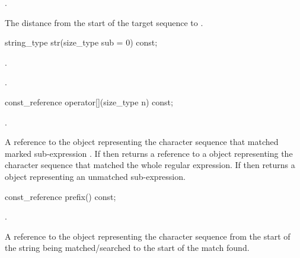 \begin{itemdescr}
\pnum
\requires {}.

\pnum
\returns  The distance from the start of the target sequence
to .
\end{itemdescr} 

%
%
\begin{itemdecl}
string_type str(size_type sub = 0) const;
\end{itemdecl}

\begin{itemdescr}
\pnum
\requires {}.

\pnum
\returns  {}.
\end{itemdescr}

%
%
\begin{itemdecl}
const_reference operator[](size_type n) const;
\end{itemdecl}

\begin{itemdescr}
\pnum
\requires {}.

\pnum
\returns  A reference to the  object representing the
character sequence that matched marked sub-expression . If 
then returns a reference to a  object representing the
character sequence that matched the whole regular expression. If
 then returns a  object representing an
unmatched sub-expression.
\end{itemdescr}

%
%
\begin{itemdecl}
const_reference prefix() const;
\end{itemdecl}

\begin{itemdescr}
\pnum
\requires {}.

\pnum
\returns  A reference to the  object representing the
character sequence from the start of the string being
matched/searched to the start of the match found.  
\end{itemdescr}

